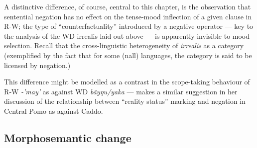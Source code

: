 A distinctive difference, of course, central to this chapter, is the observation that sentential negation has no effect on the tense-mood inflection of a given clause in R-W; the type of ``counterfactuality'' introduced by a negative operator --- key to the analysis of the WD irrealis laid out above --- is apparently invisible to mood selection. 
Recall that the cross-linguistic heterogeneity of \textit{irrealis} as a category (exemplified by the fact that for some (nall) languages, the category is said to be licensed by negation.) 

This difference might be modelled as a contrast in the scope-taking behaviour of R‑W \textit{-'may'} as against WD \textit{bäyŋu/yaka} --- \citet[]{Mithun1995} makes a similar suggestion in her discussion of the relationship between ``reality status'' marking and negation in Central Pomo as against Caddo.


\subsection{Morphosemantic change}

